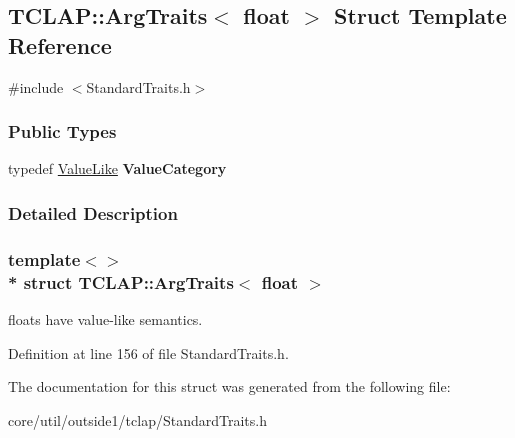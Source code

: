 \hypertarget{structTCLAP_1_1ArgTraits_3_01float_01_4}{}\subsection{T\+C\+L\+AP\+:\+:Arg\+Traits$<$ float $>$ Struct Template Reference}
\label{structTCLAP_1_1ArgTraits_3_01float_01_4}


{\ttfamily \#include $<$Standard\+Traits.\+h$>$}

\subsubsection*{Public Types}
\begin{DoxyCompactItemize}
\item 
typedef \hyperlink{structTCLAP_1_1ValueLike}{Value\+Like} {\bfseries Value\+Category}\hypertarget{structTCLAP_1_1ArgTraits_3_01float_01_4_ace983d74b1b28caa692840da15313acf}{}\label{structTCLAP_1_1ArgTraits_3_01float_01_4_ace983d74b1b28caa692840da15313acf}

\end{DoxyCompactItemize}


\subsubsection{Detailed Description}
\subsubsection*{template$<$$>$\\*
struct T\+C\+L\+A\+P\+::\+Arg\+Traits$<$ float $>$}

floats have value-\/like semantics. 

Definition at line 156 of file Standard\+Traits.\+h.



The documentation for this struct was generated from the following file\+:\begin{DoxyCompactItemize}
\item 
core/util/outside1/tclap/Standard\+Traits.\+h\end{DoxyCompactItemize}
